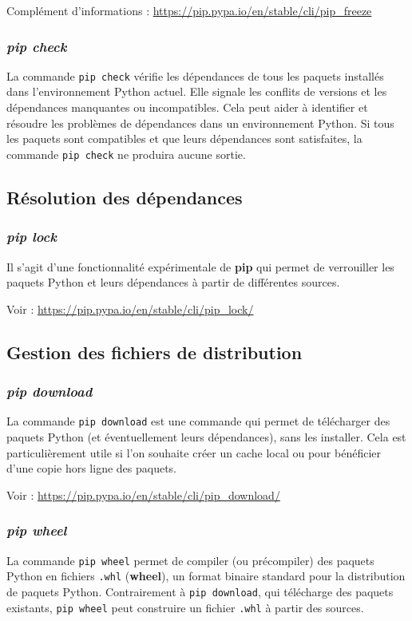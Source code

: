Complément d'informations : \url{https://pip.pypa.io/en/stable/cli/pip_freeze}

\subsubsection*{\textit{pip check}}
La commande \texttt{pip check} vérifie les dépendances de tous les paquets installés dans l'environnement Python actuel. Elle signale les conflits de versions et les dépendances manquantes ou incompatibles. Cela peut aider à identifier et résoudre les problèmes de dépendances dans un environnement Python. Si tous les paquets sont compatibles et que leurs dépendances sont satisfaites, la commande \texttt{pip check} ne produira aucune sortie.

\subsection*{Résolution des dépendances}
\subsubsection*{\textit{pip lock}}
Il s'agit d'une fonctionnalité expérimentale de \textbf{pip} qui permet de verrouiller les paquets Python et leurs dépendances à partir de différentes sources.

Voir : \url{https://pip.pypa.io/en/stable/cli/pip_lock/}

\subsection*{Gestion des fichiers de distribution}
\subsubsection*{\textit{pip download}}
La commande \texttt{pip download} est une commande qui permet de télécharger des paquets Python (et éventuellement leurs dépendances), sans les installer. Cela est particulièrement utile si l'on souhaite créer un cache local ou pour bénéficier d'une copie hors ligne des paquets.

Voir : \url{https://pip.pypa.io/en/stable/cli/pip_download/}

\subsubsection*{\textit{pip wheel}}
La commande \texttt{pip wheel} permet de compiler (ou précompiler) des paquets Python en fichiers \texttt{.whl} (\textbf{wheel}), un format binaire standard pour la distribution de paquets Python. Contrairement à \texttt{pip download}, qui télécharge des paquets existants, \texttt{pip wheel} peut construire un fichier \texttt{.whl} à partir des sources.

